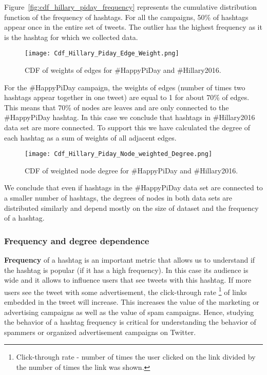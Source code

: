 \documentclass[journal, a4paper, 12pt]{article}
\begin{document}
Figure~\ref{fig:cdf_hillary_piday_frequency} represents the cumulative distribution function of the frequency of hashtags. For all the campaigns, 50\% of hashtags appear once in the entire set of tweets. The outlier has the highest frequency as it is the hashtag for which we collected data. \\

      \begin{figure}[!hbt]
            \begin{center}
            \texttt{[image: Cdf\_Hillary\_Piday\_Edge\_Weight.png]}
            \caption{CDF of weights of edges for \#HappyPiDay and \#Hillary2016.}
            \label{fig:cdf_hillary_piday_edge_weight}
            \end{center}
      \end{figure}
    
For the \#HappyPiDay campaign, the weights of edges (number of times two hashtags appear together in one tweet) are equal to 1 for about 70\% of edges. This means that 70\% of nodes are leaves and are only connected to the \#HappyPiDay hashtag. In this case we conclude that hashtags in \#Hillary2016 data set are more connected. To support this we have calculated the degree of each hashtag as a sum of weights of all adjacent edges. \\
    
        \begin{figure}[!hbt]
            \begin{center}
            \texttt{[image: Cdf\_Hillary\_Piday\_Node\_weighted\_Degree.png]}
            \caption{CDF of weighted node degree for \#HappyPiDay and \#Hillary2016.}
            \label{fig:cdf_hillary_piday_weight_sum}
            \end{center}
      \end{figure}

We conclude that even if hashtags in the \#HappyPiDay data set are connected to a smaller number of hashtags, the degrees of nodes in both data sets are distributed similarly and depend mostly on the size of dataset and the frequency of a hashtag. \\

\subsubsection{Frequency and degree dependence}
\textbf{Frequency} of a hashtag is an important metric that allows us to understand if the hashtag is popular (if it has a high frequency). In this case its audience is wide and it allows to influence users that see tweets with this hashtag. If more users see the tweet with some advertisement, the click-through rate \footnote{Click-through rate - number of times the user clicked on the link divided by the number of times the link was shown.} of links embedded in the tweet will increase. This increases the value of the marketing or advertising campaigns as well as the value of spam campaigns. Hence, studying the behavior of a hashtag frequency is critical for understanding the behavior of spammers or organized advertisement campaigns on Twitter.\\
\end{document}
